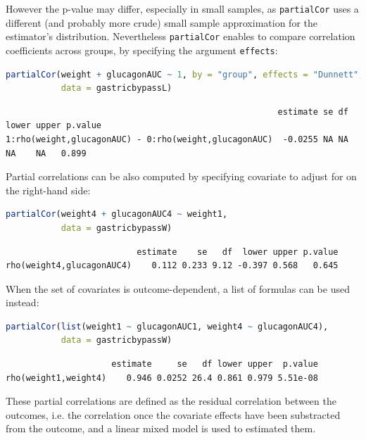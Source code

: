 \documentclass[12pt]{article}
\begin{document}
However the p-value may differ, especially in small samples, as
\texttt{partialCor} uses a different (and probably more crude) small sample
approximation for the estimator's distribution. Nevertheless
\texttt{partialCor} enables to compare correlation coefficients across
groups, by specifying the argument \texttt{effects}:
\begin{lstlisting}[language=r,numbers=none]
partialCor(weight + glucagonAUC ~ 1, by = "group", effects = "Dunnett",
           data = gastricbypassL)
\end{lstlisting}

\label{}
\begin{verbatim}
                                                      estimate se df lower upper p.value
1:rho(weight,glucagonAUC) - 0:rho(weight,glucagonAUC)  -0.0255 NA NA    NA    NA   0.899
\end{verbatim}



Partial correlations can be also computed by specifying covariate to
adjust for on the right-hand side:
\begin{lstlisting}[language=r,numbers=none]
partialCor(weight4 + glucagonAUC4 ~ weight1,
           data = gastricbypassW)
\end{lstlisting}

\label{}
\begin{verbatim}
                          estimate    se   df  lower upper p.value
rho(weight4,glucagonAUC4)    0.112 0.233 9.12 -0.397 0.568   0.645
\end{verbatim}


When the set of covariates is outcome-dependent, a list of formulas
can be used instead:
\begin{lstlisting}[language=r,numbers=none]
partialCor(list(weight1 ~ glucagonAUC1, weight4 ~ glucagonAUC4),
           data = gastricbypassW)
\end{lstlisting}

\label{}
\begin{verbatim}
                     estimate     se   df lower upper  p.value
rho(weight1,weight4)    0.946 0.0252 26.4 0.861 0.979 5.51e-08
\end{verbatim}


These partial correlations are defined as the residual correlation
between the outcomes, i.e. the correlation once the covariate effects
have been substracted from the outcome, and a linear mixed model is
used to estimated them.
\end{document}
